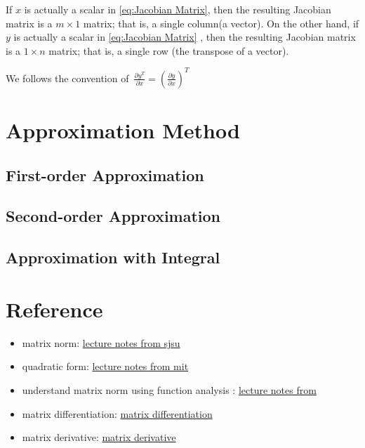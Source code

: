 \begin{remark}
    If $x$ is actually a scalar in \eqref{eq:Jacobian Matrix}, then the resulting Jacobian matrix is a $m\times 1$ matrix;
    that is, a single column(a vector). 
    On the other hand, if $y$ is actually a scalar in \eqref{eq:Jacobian Matrix} , then the resulting Jacobian matrix is a $1\times n$ matrix; 
    that is, a single row (the transpose of a vector).
\end{remark}
\begin{remark}
    We follows the convention of\ $\frac{\partial y^T}{\partial x}=(\frac{\partial y}{\partial x})^T$
\end{remark}

\section{Approximation Method}
\subsection{First-order Approximation}

\subsection{Second-order Approximation}

\subsection{Approximation with Integral}



\section{Reference}
\begin{itemize}
    \item matrix norm: \href{https://www.sjsu.edu/faculty/guangliang.chen/Math253S20/lec7matrixnorm.pdf}{lecture notes from sjsu}
    \item quadratic form: \href{https://ocw.mit.edu/courses/15-084j-nonlinear-programming-spring-2004/resources/lec4_quad_form/}{lecture notes from mit}
    \item understand matrix norm using function analysis : \href{https://sites.math.washington.edu/~greenbau/Math_554/Course_Notes/ch1.3new.pdf}{lecture notes from }
    \item matrix differentiation: \href{https://atmos.washington.edu/~dennis/MatrixCalculus.pdf}{matrix differentiation}
    \item matrix derivative: \href{https://www.doc.ic.ac.uk/~ahanda/referencepdfs/MatrixCalculus.pdf}{matrix derivative}
\end{itemize}

